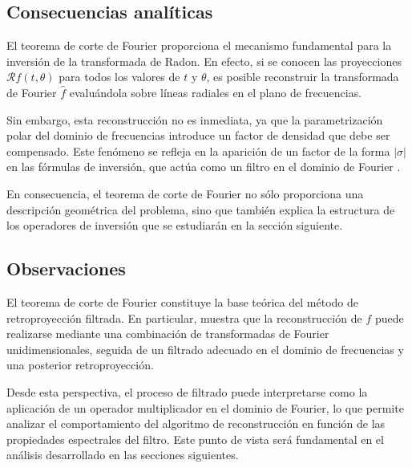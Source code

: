 \subsection*{Consecuencias analíticas}

El teorema de corte de Fourier proporciona el mecanismo fundamental para la inversión de la transformada de Radon. En efecto, si se conocen las proyecciones $\mathcal{R}f(t,\theta)$ para todos los valores de $t$ y $\theta$, es posible reconstruir la transformada de Fourier $\widehat{f}$ evaluándola sobre líneas radiales en el plano de frecuencias.

Sin embargo, esta reconstrucción no es inmediata, ya que la parametrización polar del dominio de frecuencias introduce un factor de densidad que debe ser compensado. Este fenómeno se refleja en la aparición de un factor de la forma $|\sigma|$ en las fórmulas de inversión, que actúa como un filtro en el dominio de Fourier \cite{natterer2001,kuchment2014}.

En consecuencia, el teorema de corte de Fourier no sólo proporciona una descripción geométrica del problema, sino que también explica la estructura de los operadores de inversión que se estudiarán en la sección siguiente.

\subsection*{Observaciones}

El teorema de corte de Fourier constituye la base teórica del método de retroproyección filtrada. En particular, muestra que la reconstrucción de $f$ puede realizarse mediante una combinación de transformadas de Fourier unidimensionales, seguida de un filtrado adecuado en el dominio de frecuencias y una posterior retroproyección.

Desde esta perspectiva, el proceso de filtrado puede interpretarse como la aplicación de un operador multiplicador en el dominio de Fourier, lo que permite analizar el comportamiento del algoritmo de reconstrucción en función de las propiedades espectrales del filtro. Este punto de vista será fundamental en el análisis desarrollado en las secciones siguientes.